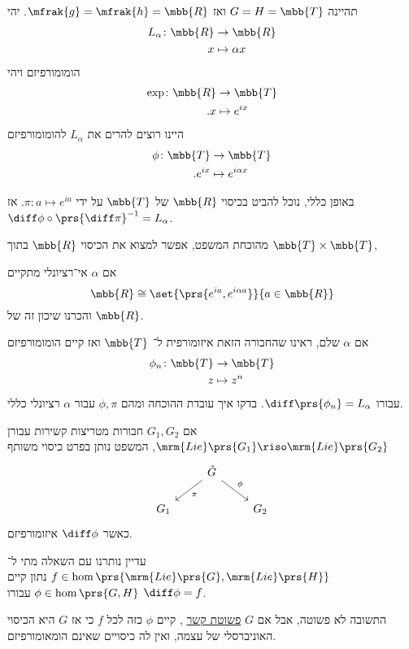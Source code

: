 \documentclass[10pt, twoside]{book}
\newcommand{\Lie}{\mrm{Lie}}
\begin{document}
\begin{example}
תהיינה
$G=H=\mbb{T}$
ואז
$\mfrak{g} = \mfrak{h} = \mbb{R}$.
יהי
\begin{align*}
L_\alpha \colon \mbb{R} &\to \mbb{R} \\
x &\mapsto \alpha x
\end{align*}
הומומורפיזם ויהי
\begin{align*}
\exp \colon \mbb{R} &\to \mbb{T} \\
\text{.} x &\mapsto e^{ix}
\end{align*}
היינו רוצים להרים את
$L_\alpha$
להומומורפיזם
\begin{align*}
\phi \colon \mbb{T} &\to \mbb{T} \\
\text{.} e^{ix} &\mapsto e^{i\alpha x}
\end{align*}

באופן כללי, נוכל להביט בכיסוי
$\mbb{R}$
של
$\mbb{T}$
על ידי
$\pi \colon a \mapsto e^{ia}$.
אז
$\diff \phi \circ \prs{\diff \pi}^{-1} = L_\alpha$.

מהוכחת המשפט, אפשר למצוא את הכיסוי
$\mbb{R}$
בתוך
$\mbb{T} \times \mbb{T}$,

אם
$\alpha$
אי־רציונלי
מתקיים
\[\mbb{R} \cong \set{\prs{e^{ia}, e^{i \alpha a}}}{a \in \mbb{R}}\]
והכרנו שיכון זה של
$\mbb{R}$.

אם
$\alpha$
שלם, ראינו שהחבורה הזאת איזומורפית ל־%
$\mbb{T}$
ואז קיים הומומורפיזם
\begin{align*}
\phi_n \colon \mbb{T} &\to \mbb{T} \\
z &\mapsto z^n
\end{align*}
עבורו
$\diff \prs{\phi_n} = L_\alpha$.
בדקו איך עובדת ההוכחה ומהם
$\phi, \pi$
עבור
$\alpha$
רציונלי כללי.
\end{example}

\begin{remark}
אם
$G_1, G_2$
חבורות מטריצות קשירות עבורן
$\Lie\prs{G_1} \riso \Lie\prs{G_2}$,
המשפט נותן בפרט כיסוי משותף
\[
\begin{tikzcd}
& \tilde{G} \arrow[dl, "\pi"] \arrow[dr, "\phi"] & \\
G_1 & & G_2
\end{tikzcd}
\]
כאשר
$\diff \phi$
איזומורפיזם.
\end{remark}

עדיין נותרנו עם השאלה מתי ל־%
$f \in \hom\prs{\Lie\prs{G}, \Lie\prs{H}}$
נתון קיים
$\phi \in \hom\prs{G,H}$
עבורו
$\diff \phi = f$.

התשובה לא פשוטה, אבל אם
$G$
\href{https://en.wikipedia.org/wiki/Simply_connected_space}{פשוטת קשר}%
, קיים
$\phi$
כזה לכל
$f$
כי אז
$G$
היא הכיסוי האוניברסלי של עצמה, ואין לה כיסויים שאינם הומאומורפיזם.
\end{document}
